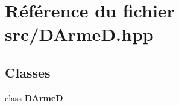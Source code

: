 \section{Référence du fichier src/\-D\-Arme\-D.hpp}
\label{_d_arme_d_8hpp}
\subsection*{Classes}
\begin{DoxyCompactItemize}
\item 
class {\bf D\-Arme\-D}
\end{DoxyCompactItemize}
